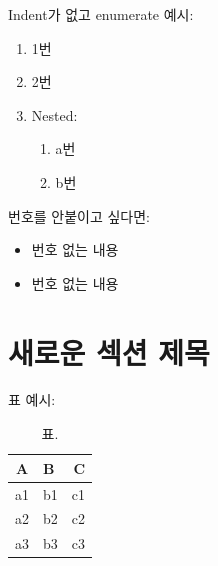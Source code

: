 \documentclass[11pt,a4paper]{article}
\begin{document}
    \noindent Indent가 없고 enumerate 예시:

    \begin{enumerate}
        \item 1번
        \item 2번
        \item Nested:
            \begin{enumerate}
                \item a번
                \item b번
            \end{enumerate}
    \end{enumerate}

    번호를 안붙이고 싶다면:

    \begin{itemize}
        \item 번호 없는 내용
        \item 번호 없는 내용
    \end{itemize}

\section{새로운 섹션 제목}

    표 예시:

    \begin{table}[h]
        \centering
        \caption{표.}
        \label{tab:dataset}
        \begin{tabular}{c|lr}
            \toprule
                A  & B  & C \\
            \midrule
                a1 & b1 & c1 \\
                a2 & b2 & c2 \\
                a3 & b3 & c3 \\
            \bottomrule
        \end{tabular}
    \end{table}
    


\vspace{1.0em}
\printbibliography[title={참고문헌}]

\end{document}
